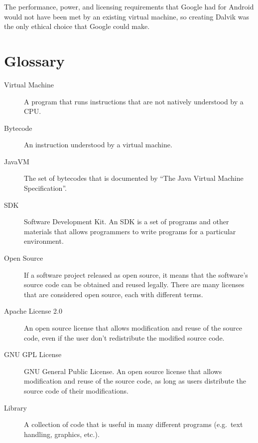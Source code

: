 \documentclass[11pt]{article}
\begin{document}
\begin{multicols}{2}
The performance, power, and licensing requirements that Google had for Android
would not have been met by an existing virtual machine, so creating Dalvik was
the only ethical choice that Google could make.


\appendix

\section{Glossary} %
\label{sec:glossary}

\begin{description}
    \item[Virtual Machine] A program that runs instructions that are not
    natively understood by a CPU.
    \item[Bytecode] An instruction understood by a virtual machine.
    \item[JavaVM] The set of bytecodes that is documented by ``The Java Virtual
    Machine Specification''. \cite{javavm-bytecode}
    \item[SDK] Software Development Kit.  An SDK is a set of programs and other
    materials that allows programmers to write programs for a particular
    environment.
    \item[Open Source] If a software project released as open source, it means
    that the software's source code can be obtained and reused legally.  There
    are many licenses that are considered open source, each with different
    terms.
    \item[Apache License 2.0] An open source license that allows modification
    and reuse of the source code, even if the user don't redistribute the
    modified source code. \cite{apache-license}
    \item[GNU GPL License] GNU General Public License.  An open source license
    that allows modification and reuse of the source code, as long as users
    distribute the source code of their modifications. \cite{gpl-license}
    \item[Library] A collection of code that is useful in many different
    programs (e.g.\ text handling, graphics, etc.).
\end{description}


\end{multicols}
\newpage

\nocite{*}


\end{document}
